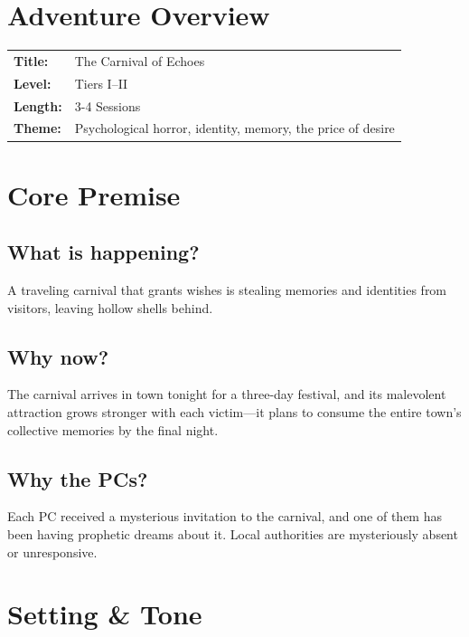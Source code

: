 \documentclass[11pt]{article}
\begin{document}


\section*{Adventure Overview}

\begin{tabularx}{\textwidth}{@{}lX@{}}
\textbf{Title:} & The Carnival of Echoes \\
\textbf{Level:} & Tiers I--II \\
\textbf{Length:} & 3-4 Sessions \\
\textbf{Theme:} & Psychological horror, identity, memory, the price of desire \\
\end{tabularx}


\section{Core Premise}

\subsection{What is happening?}
A traveling carnival that grants wishes is stealing memories and identities from visitors, leaving hollow shells behind.

\subsection{Why now?}
The carnival arrives in town tonight for a three-day festival, and its malevolent attraction grows stronger with each victim---it plans to consume the entire town's collective memories by the final night.

\subsection{Why the PCs?}
Each PC received a mysterious invitation to the carnival, and one of them has been having prophetic dreams about it. Local authorities are mysteriously absent or unresponsive.

\section{Setting \& Tone}
\end{document}
